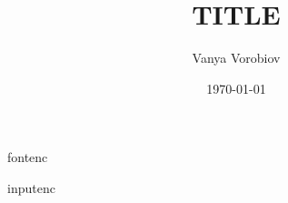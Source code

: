 
\usepackage{cmap}
\usepackage{T2A}{fontenc}
\usepackage{utf8}{inputenc}
\usepackage{amsfonts}
\usepackage{amsthm}
\usepackage{mathtools}
\usepackage{color}
\usepackage{hyperref}
\usepackage{graphicx}
\usepackage{pdfpages}
\usepackage{forest}
\usepackage{adjustbox}
\usepackage{times}
\usepackage{tikz}


\newtheorem{theorem}{Theorem}[section]
\newtheorem{lemma}{Lemma}[section]
\newtheorem{proposition}{Proposition}[section]
\newtheorem{corollary}{Corollary}[section]
\newtheorem{definition}{Definition}[section]
\newtheorem{remark}{Remark}[section]
\newtheorem{example}{Example}[section]

\newcommand{\E}{\ensuremath{\mathbb{E}}}
\newcommand{\D}{\ensuremath{\mathbb{D}}}
\newcommand{\C}{\ensuremath{\mathbb{C}}}
\newcommand{\R}{\ensuremath{\mathbb{R}}}
\newcommand{\Q}{\ensuremath{\mathbb{Q}}}

\newcommand{\red}[1]{\textcolor{red}{#1}}
\newcommand{\blue}[1]{\textcolor{blue}{#1}}
\newcommand{\green}[1]{\textcolor{green}{#1}}
\newcommand{\orange}[1]{\textcolor{orange}{#1}}
\newcommand{\teal}[1]{\textcolor{teal}{#1}}
\newcommand{\purple}[1]{\textcolor{purple}{#1}}

\renewcommand{\phi}{\varphi}
\renewcommand{\epsilon}{\varepsilon}
\renewcommand{\le}{\leqslant}
\renewcommand{\ge}{\geqslant}



    \title[TITLE_SHORT]{TITLE}
    \author{Vanya Vorobiov}
    \date{\today}

    \begin{frame}
        \titlepage
    \end{frame}

